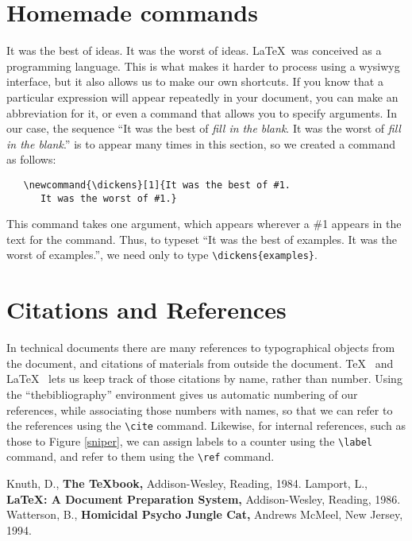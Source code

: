 \documentclass[12pt]{article}
\begin{document}
\section{Homemade commands}
\newcommand{\dickens}[1]{It was the best of #1. It was the worst of #1.}
\dickens{ideas}
\LaTeX\ was conceived as a programming language.  This is what makes it
harder to process using a wysiwyg interface, but it also allows
us to make our own shortcuts.
If you know that a particular expression will appear repeatedly
in your document, you can make an abbreviation for it, or even
a command that allows you to specify arguments.  In our case,
the sequence ``\dickens{{\it fill in the blank}}''
   is to appear many times in this section, so we created a command
   as follows:
   \begin{verbatim}
   \newcommand{\dickens}[1]{It was the best of #1. 
      It was the worst of #1.}
   \end{verbatim}
   This command takes one argument, which appears wherever a \#1 appears
   in the text for the command.  Thus, to typeset ``\dickens{examples}'',
we need only to type \verb(\dickens{examples}(.

\section{Citations and References}
In technical documents there are many references to 
typographical objects from the document, and citations
of materials from outside the document.  \TeX\ \cite{knuth}
and \LaTeX\ \cite{lamport} lets us keep track of those citations
by name, rather than number.  Using the ``thebibliography'' 
environment gives us automatic numbering of our references,
while associating those numbers with names, so that we can
refer to the references using the \verb(\cite( command.
Likewise, for internal references, such as those to Figure \ref{sniper},
   we can assign labels to a counter using the \verb(\label(
   command, and refer to them using the \verb(\ref( command.

   \begin{thebibliography}{X}
    Knuth, D., {\bf The \TeX book,} Addison-Wesley, Reading, 1984.
    Lamport, L., {\bf \LaTeX: A Document Preparation System,}
   Addison-Wesley, Reading, 1986.
    Watterson, B., {\bf Homicidal Psycho Jungle Cat,}
   Andrews McMeel, New Jersey, 1994.
   \end{thebibliography}
   
\end{document}
